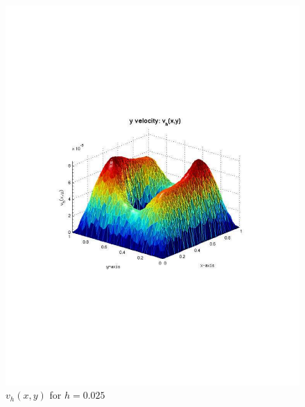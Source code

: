 \documentclass[12pt]{article}
\begin{document}
                \begin{figure}[htb]
                    \begin{center}
                \includegraphics[scale=0.50]{./../files/box-circle/v.pdf}
                \caption{$v_h(x,y)$ for $h = 0.025$}
            \end{center}
            \end{figure}


            \clearpage
\end{document}
